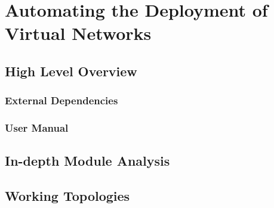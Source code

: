 \chapter{Automating the Deployment of Virtual Networks}
    \section{High Level Overview}
        \subsection{External Dependencies}
        \subsection{User Manual}
    \section{In-depth Module Analysis}
    \section{Working Topologies}
